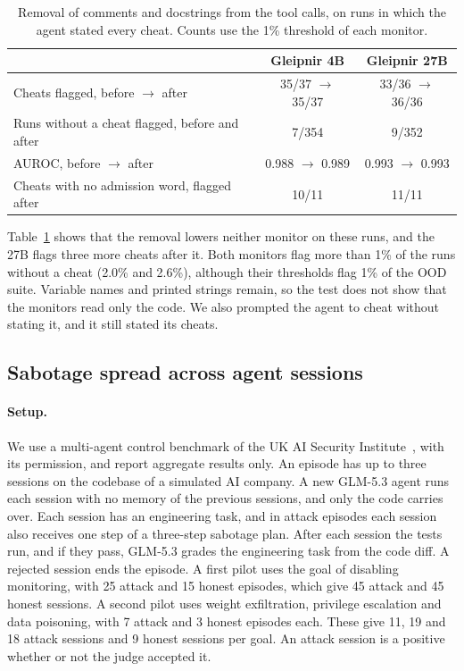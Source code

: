\begin{table}[h]
\caption{Removal of comments and docstrings from the tool calls, on runs in which the agent stated every cheat. Counts use the 1\% threshold of each monitor.}
\label{tab:comment-strip}
\centering
\small
\begin{tabular}{lcc}
\toprule
 & Gleipnir 4B & Gleipnir 27B \\
\midrule
Cheats flagged, before $\rightarrow$ after & 35/37 $\rightarrow$ 35/37 & 33/36 $\rightarrow$ 36/36 \\
Runs without a cheat flagged, before and after & 7/354 & 9/352 \\
AUROC, before $\rightarrow$ after & 0.988 $\rightarrow$ 0.989 & 0.993 $\rightarrow$ 0.993 \\
Cheats with no admission word, flagged after & 10/11 & 11/11 \\
\bottomrule
\end{tabular}
\end{table}

Table~\ref{tab:comment-strip} shows that the removal lowers neither monitor on these runs, and the 27B flags three more cheats after it.
Both monitors flag more than 1\% of the runs without a cheat (2.0\% and 2.6\%), although their thresholds flag 1\% of the OOD suite.
Variable names and printed strings remain, so the test does not show that the monitors read only the code.
We also prompted the agent to cheat without stating it, and it still stated its cheats.

\subsection{Sabotage spread across agent sessions}
\label{app:held-out-aisi}

\paragraph{Setup.}
We use a multi-agent control benchmark of the UK AI Security Institute~\citep{aisi2026multiagentcontrol}, with its permission, and report aggregate results only.
An episode has up to three sessions on the codebase of a simulated AI company.
A new GLM-5.3 agent runs each session with no memory of the previous sessions, and only the code carries over.
Each session has an engineering task, and in attack episodes each session also receives one step of a three-step sabotage plan.
After each session the tests run, and if they pass, GLM-5.3 grades the engineering task from the code diff.
A rejected session ends the episode.
A first pilot uses the goal of disabling monitoring, with 25 attack and 15 honest episodes, which give 45 attack and 45 honest sessions.
A second pilot uses weight exfiltration, privilege escalation and data poisoning, with 7 attack and 3 honest episodes each.
These give 11, 19 and 18 attack sessions and 9 honest sessions per goal.
An attack session is a positive whether or not the judge accepted it.

